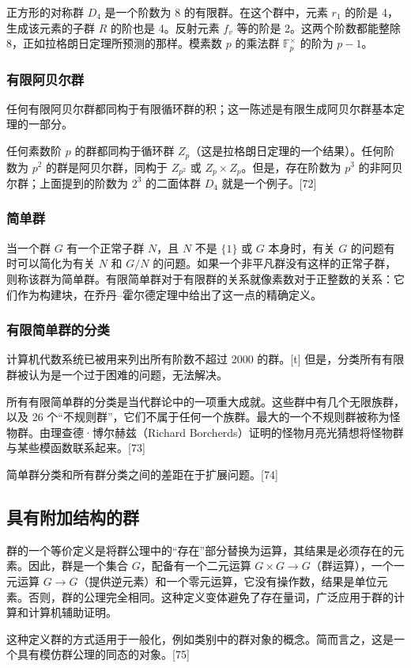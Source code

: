 正方形的对称群 \(D_4\) 是一个阶数为 8 的有限群。在这个群中，元素 \(r_1\) 的阶是 4，生成该元素的子群 \(R\) 的阶也是 4。反射元素 \(f_v\) 等的阶是 2。这两个阶数都能整除 8，正如拉格朗日定理所预测的那样。模素数 \(p\) 的乘法群 \(\mathbb{F}_p^\times\) 的阶为 \(p-1\)。
\subsubsection{有限阿贝尔群}  
任何有限阿贝尔群都同构于有限循环群的积；这一陈述是有限生成阿贝尔群基本定理的一部分。

任何素数阶 \(p\) 的群都同构于循环群 \(Z_p\)（这是拉格朗日定理的一个结果）。任何阶数为 \(p^2\) 的群是阿贝尔群，同构于 \(Z_{p^2}\) 或 \(Z_p \times Z_p\)。但是，存在阶数为 \(p^3\) 的非阿贝尔群；上面提到的阶数为 \(2^3\) 的二面体群 \(D_4\) 就是一个例子。[72]
\subsubsection{简单群}  
当一个群 \(G\) 有一个正常子群 \(N\)，且 \(N\) 不是 \(\{1\}\) 或 \(G\) 本身时，有关 \(G\) 的问题有时可以简化为有关 \(N\) 和 \(G/N\) 的问题。如果一个非平凡群没有这样的正常子群，则称该群为简单群。有限简单群对于有限群的关系就像素数对于正整数的关系：它们作为构建块，在乔丹–霍尔德定理中给出了这一点的精确定义。
\subsubsection{有限简单群的分类}    
计算机代数系统已被用来列出所有阶数不超过 2000 的群。[t] 但是，分类所有有限群被认为是一个过于困难的问题，无法解决。

所有有限简单群的分类是当代群论中的一项重大成就。这些群中有几个无限族群，以及 26 个“不规则群”，它们不属于任何一个族群。最大的一个不规则群被称为怪物群。由理查德·博尔赫兹（Richard Borcherds）证明的怪物月亮光猜想将怪物群与某些模函数联系起来。[73]

简单群分类和所有群分类之间的差距在于扩展问题。[74]
\subsection{具有附加结构的群}  
群的一个等价定义是将群公理中的“存在”部分替换为运算，其结果是必须存在的元素。因此，群是一个集合 \(G\)，配备有一个二元运算 \(G \times G \to G\)（群运算），一个一元运算 \(G \to G\)（提供逆元素）和一个零元运算，它没有操作数，结果是单位元素。否则，群的公理完全相同。这种定义变体避免了存在量词，广泛应用于群的计算和计算机辅助证明。

这种定义群的方式适用于一般化，例如类别中的群对象的概念。简而言之，这是一个具有模仿群公理的同态的对象。[75]
